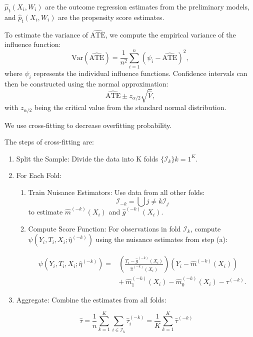 \documentclass{article}
\begin{document}
\( \hat{\mu}_t(X_i, W_i) \) are the outcome regression estimates from the preliminary models, and \( \hat{p}_t(X_i, W_i) \) are the propensity score estimates.

To estimate the variance of \( \hat{\text{ATE}} \), we compute the empirical variance of the influence function:
\[
\text{Var}(\hat{\text{ATE}}) = \frac{1}{n^2} \sum_{i=1}^n \left( \psi_i - \hat{\text{ATE}} \right)^2,
\]
where \( \psi_i \) represents the individual influence functions. Confidence intervals can then be constructed using the normal approximation:
\[
\hat{\text{ATE}} \pm z_{\alpha/2} \sqrt{\hat{V}},
\]
with \( z_{\alpha/2} \) being the critical value from the standard normal distribution.

We use cross-fitting to decrease overfitting probability.

The steps of cross-fitting are:

\begin{enumerate}
\item Split the Sample: Divide the data into K folds $\{\mathcal{I}_k\}{k=1}^K$.
\item For Each Fold:
\begin{enumerate}
\item Train Nuisance Estimators: Use data from all other folds:
$$
\mathcal{I}_{-k} = \bigcup{j \neq k} \mathcal{I}_j
$$
to estimate $\hat{m}^{(-k)}(X_i)$ and $\hat{g}^{(-k)}(X_i)$.

\item Compute Score Function: For observations in fold $\mathcal{I}_k$, compute $\psi(Y_i, T_i, X_i; \hat{\eta}^{(-k)})$ using the nuisance estimates from step (a):

\begin{equation}
    \begin{split}
        \psi(Y_i, T_i, X_i; \hat{\eta}^{(-k)}) = & \left( \frac{T_i - \hat{g}^{(-k)}(X_i)}{\hat{\pi}^{(-k)}(X_i)} \right) (Y_i - \hat{m}^{(-k)}(X_i)) \\
        & + \ \hat{m}_1^{(-k)}(X_i) - \hat{m}_0^{(-k)}(X_i) - \tau^{(-k)}.
    \end{split}
    \label{eq:orthogonal_score_fold_k}
\end{equation}

\end{enumerate}
\item Aggregate: Combine the estimates from all folds:

\begin{equation}
\hat{\tau} = \frac{1}{n} \sum_{k=1}^K \sum_{i \in \mathcal{I}_k} \hat{\tau}_i^{(-k)} =  \frac{1}{K} \sum_{k=1}^K \hat{\tau}^{(-k)}
\label{eq:avg_tau_hat}
\end{equation}

\end{enumerate}
\end{document}
